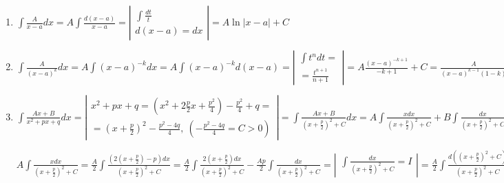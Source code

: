 \documentclass{report}
\theoremstyle{definition}
\begin{document}
\begin{enumerate}
  \item \(\int \frac{A}{x - a} dx = A \int \frac{d(x-a)}{x-a} =
        \left|
        \begin{array}{c}
          \int \frac{dt}{t} \\
          d(x-a) = dx
        \end{array}
        \right| = A \ln |x - a| + C\)
  \item \(\int \frac{A}{(x-a)^{k}} dx = A \int (x - a)^{-k} dx = A \int (x-a)^{-k} d(x-a) =
        \left|
        \begin{array}{c}
          \int t^{n}dt = \\
          = \frac{t^{n+1}}{n+1}
        \end{array}
        \right| = A \frac{(x-a)^{-k + 1}}{-k + 1} + C = \frac{A}{(x-a)^{k-1}(1-k)} + C\)

        \clearpage
  \item \(\int \frac{Ax + B}{x^{2} + px + q} dx =
        \left|
        \begin{array}{c}
          x^{2} + px + q = (x^{2} + 2\frac{p}{2}x + \frac{p^{2}}{4}) - \frac{p^{2}}{4} + q = \\
          = (x + \frac{p}{2})^{2} - \frac{p^{2} - 4q}{4}, \ (- \frac{p^{2} - 4q}{4} = C > 0)
        \end{array}
        \right| = \int \frac{Ax + B}{(x + \frac{p}{2})^{2} + C} dx = A \int \frac{x dx}{(x + \frac{p}{2})^{2}
          + C} + B \int \frac{dx}{(x + \frac{p}{2})^{2} + C} =
        \left|
        \begin{array}{c}
          d((x + \frac{p}{2})^{2} + C) = \\
          = 2(x + \frac{p}{2} dx)
        \end{array}
        \right| = \ldots\) \\

        \begin{center}
          \begin{minipage}{8cm}
            \setlength{\parindent}{0em}
            \(A \int \frac{x dx}{(x + \frac{p}{2})^{2} + C} = \frac{A}{2} \int \frac{(2(x + \frac{p}{2})-p)dx}
            {(x + \frac{p}{2})^{2} + C} = \frac{A}{2} \int \frac{2(x + \frac{p}{2})dx}{(x + \frac{p}{2})^{2} + C} -
            \frac{Ap}{2} \int \frac{dx}{(x + \frac{p}{2})^{2} + C} =
            \left|
            \begin{array}{c}
              \int \frac{dx}{(x + \frac{p}{2})^{2} + C} = I
            \end{array}
            \right| = \frac{A}{2} \int \frac{d((x + \frac{p}{2})^{2} + C)}{(x + \frac{p}{2})^{2} + C} -
            \frac{Ap}{2} I = \frac{A}{2} \ln |(x + \frac{p}{2})^{2} + C| - \frac{Ap}{2}I;\) \\


\end{minipage}
\end{center}
\end{enumerate}
\end{document}
